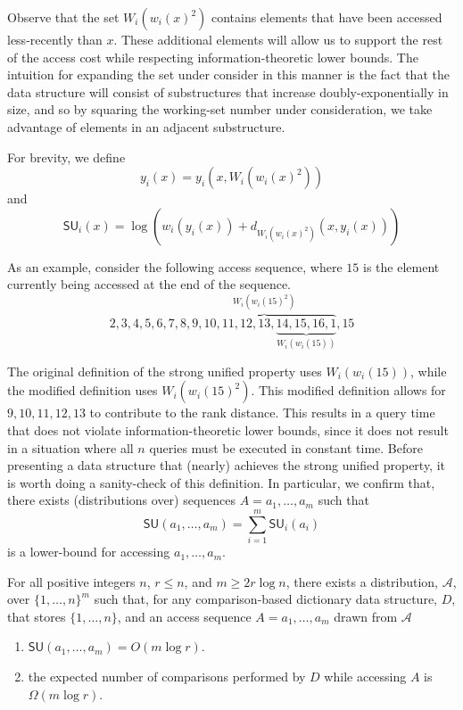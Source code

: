 \documentclass{llncs}
\newcommand{\BigOh}[1]{O\!\left(#1\right)}
\newcommand{\SU}[1]{\textsf{SU}_i\!\left(#1\right)}
\newcommand{\su}[1]{\textsf{SU}\!\left(#1\right)}
\begin{document}
Observe that the set $W_i(w_i(x)^2)$ contains elements that have been accessed less-recently than $x$. These additional elements will allow us to support the rest of the access cost while respecting information-theoretic lower bounds. The intuition for expanding the set under consider in this manner is the fact that the data structure will consist of substructures that increase doubly-exponentially in size, and so by squaring the working-set number under consideration, we take advantage of elements in an adjacent substructure.

For brevity, we define
\begin{displaymath}
	y_i(x) = y_i(x,W_i(w_i(x)^2))
\end{displaymath}
and
\begin{displaymath}
	\SU{x} = \log (w_i(y_i(x)) + d_{W_i(w_i(x)^2)}(x,y_i(x)))
\end{displaymath}

As an example, consider the following access sequence, where $15$ is the element currently being accessed at the end of the sequence.
\begin{displaymath}
2, 3, 4, 5, 6, 7, 8, \overbrace{9, 10, 11, 12, 13, \underbrace{14, 15, 16, 1}_{W_i(w_i(15))}}^{W_i(w_i(15)^2)}, 15
\end{displaymath}

The original definition of the strong unified property uses $W_i(w_i(15))$, while the modified definition uses $W_i(w_i(15)^2)$. This modified definition allows for $9,10,11,12,13$ to contribute to the rank distance. This results in a query time that does not violate information-theoretic lower bounds, since it does not result in a situation where all $n$ queries must be executed in constant time. 
Before presenting a data structure that (nearly) achieves the strong unified property, it is worth doing a sanity-check of this definition.  In particular, we confirm that, there exists (distributions over) sequences $A=a_1,\ldots,a_m$ such that
\[
   \su{a_1,\ldots,a_m} = \sum_{i=1}^m \SU{a_i}
\]
is a lower-bound for accessing $a_1,\ldots,a_m$.

\begin{theorem}
  For all positive integers $n$, $r\le n$, and $m\ge 2r\log n$, there exists a distribution, $\mathcal{A}$, over $\{1,\ldots,n\}^m$ such that, for any comparison-based dictionary data structure, $D$, that stores $\{1,\ldots,n\}$, and an access sequence $A=a_1,\ldots,a_m$ drawn from $\mathcal{A}$
\begin{enumerate}
 \item $\su{a_1,\ldots,a_m}=\BigOh{m\log r}$.
 \item the expected number of comparisons performed by $D$ while accessing $A$ is $\Omega(m\log r)$.
\end{enumerate}
\end{theorem}
\end{document}

